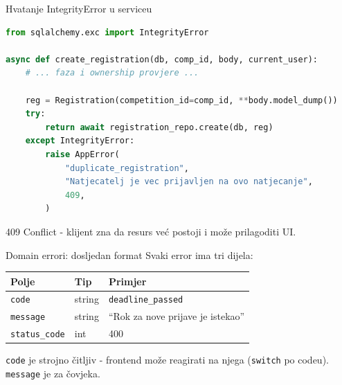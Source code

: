 \begin{frame}[fragile,shrink=5]{Hvatanje IntegrityError u serviceu}
\begin{lstlisting}[language=python]
from sqlalchemy.exc import IntegrityError

async def create_registration(db, comp_id, body, current_user):
    # ... faza i ownership provjere ...

    reg = Registration(competition_id=comp_id, **body.model_dump())
    try:
        return await registration_repo.create(db, reg)
    except IntegrityError:
        raise AppError(
            "duplicate_registration",
            "Natjecatelj je vec prijavljen na ovo natjecanje",
            409,
        )
\end{lstlisting}

\vspace{0.4em}
409 Conflict - klijent zna da resurs već postoji i može prilagoditi UI.
\end{frame}

\begin{frame}{Domain errori: dosljedan format}
Svaki error ima tri dijela:

\vspace{0.4em}
\begin{tabular}{@{}llp{6cm}@{}}
  \toprule
  \textbf{Polje} & \textbf{Tip} & \textbf{Primjer} \\
  \midrule
  \texttt{code} & string & \texttt{deadline\_passed} \\
  \texttt{message} & string & \enquote{Rok za nove prijave je istekao} \\
  \texttt{status\_code} & int & 400 \\
  \bottomrule
\end{tabular}

\vspace{0.6em}
\texttt{code} je strojno čitljiv - frontend može reagirati na njega (\texttt{switch} po codeu).
\texttt{message} je za čovjeka.
\end{frame}

